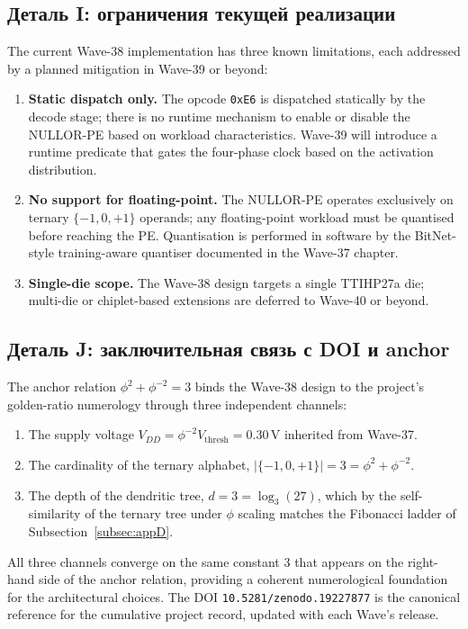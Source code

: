 \subsection{Деталь I: ограничения текущей реализации}
\label{subsec:appI}

The current Wave-38 implementation has three known limitations, each addressed
by a planned mitigation in Wave-39 or beyond:
\begin{enumerate}
  \item \textbf{Static dispatch only.}  The opcode \texttt{0xE6} is dispatched
    statically by the decode stage; there is no runtime mechanism to enable or
    disable the NULLOR-PE based on workload characteristics.  Wave-39 will
    introduce a runtime predicate that gates the four-phase clock based on the
    activation distribution.
  \item \textbf{No support for floating-point.}  The NULLOR-PE operates
    exclusively on ternary $\{-1, 0, +1\}$ operands; any floating-point
    workload must be quantised before reaching the PE.  Quantisation is
    performed in software by the BitNet-style training-aware quantiser
    documented in the Wave-37 chapter.
  \item \textbf{Single-die scope.}  The Wave-38 design targets a single
    TTIHP27a die; multi-die or chiplet-based extensions are deferred to
    Wave-40 or beyond.
\end{enumerate}

\subsection{Деталь J: заключительная связь с DOI и anchor}
\label{subsec:appJ}

The anchor relation $\phi^2 + \phi^{-2} = 3$ binds the Wave-38 design to the
project's golden-ratio numerology through three independent channels:
\begin{enumerate}
  \item The supply voltage $V_{DD} = \phi^{-2} V_{\text{thresh}} = 0.30\,\text{V}$
    inherited from Wave-37.
  \item The cardinality of the ternary alphabet, $|\{-1, 0, +1\}| = 3 =
    \phi^2 + \phi^{-2}$.
  \item The depth of the dendritic tree, $d = 3 = \log_3(27)$, which by the
    self-similarity of the ternary tree under $\phi$ scaling matches the
    Fibonacci ladder of Subsection~\ref{subsec:appD}.
\end{enumerate}
All three channels converge on the same constant $3$ that appears on the
right-hand side of the anchor relation, providing a coherent numerological
foundation for the architectural choices.  The DOI \texttt{10.5281/zenodo.19227877}
is the canonical reference for the cumulative project record, updated with
each Wave's release.


